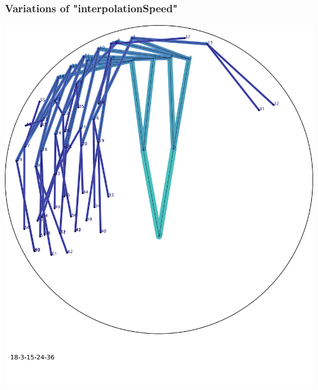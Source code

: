 \documentclass{scrartcl}
\newcommand{\imgSize}{0.46}
\begin{document}
\newpage
\subsubsection{Variations of "interpolationSpeed"}

\begin{minipage}[t]{\imgSize\textwidth}
\includegraphics[width=\textwidth]{img_18-3-15-24-36}
\end{minipage}
\hspace{0.5cm}
\end{document}
